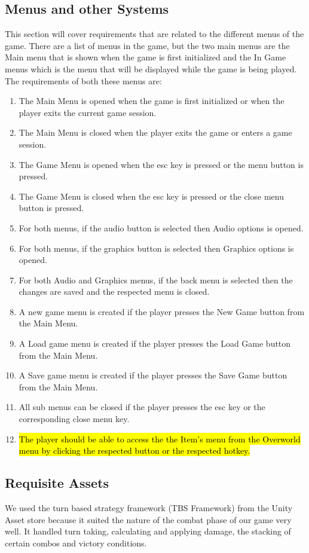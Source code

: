 \documentclass{article}
\begin{document}
\subsection{Menus and other Systems}
\quad This section will cover requirements that are related to the different menus of the game. There are a list of menus in the game, but the two main menus are the Main menu that is shown when the game is first initialized and the In Game menus which is the menu that will be displayed while the game is being played. The requirements of both these menus are:
\begin{enumerate}[{MR}1. ]
	\item The Main Menu is opened when the game is first initialized or when the player exits the current game session.
	\item The Main Menu is closed when the player exits the game or enters a game session.
	\item The Game Menu is opened when the esc key is pressed or the menu button is pressed.
	\item The Game Menu is closed when the esc key is pressed or the close menu button is pressed.
	\item For both menus, if the audio button is selected then Audio options is opened.
	\item For both menus, if the graphics button is selected then Graphics options is opened.
	\item For both Audio and Graphics menus, if the back menu is selected then the changes are saved and the respected menu is closed.
	\item A new game menu is created if the player presses the New Game button from the Main Menu.
	\item A Load game menu is created if the player presses the Load Game button from the Main Menu.
	\item A Save game menu is created if the player presses the Save Game button from the Main Menu.
	\item All sub menus can be closed if the player presses the esc key or the corresponding close menu key.	
	\item \hl{The player should  be able to access the the Item's menu from the Overworld menu by clicking the respected button or the respected hotkey.}
\end{enumerate}
\subsection{Requisite Assets}
\quad We used the turn based strategy framework (TBS Framework) from the Unity Asset store because it suited the nature of the combat phase of our game very well. It handled turn taking, calculating and applying damage, the stacking of certain combos and victory conditions.
\end{document}
